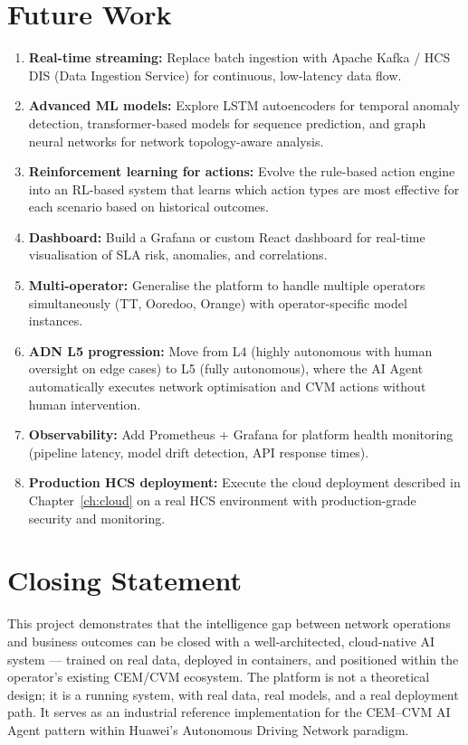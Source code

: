 \section{Future Work}

\begin{enumerate}
  \item \textbf{Real-time streaming:} Replace batch ingestion with Apache Kafka / HCS DIS (Data Ingestion Service) for continuous, low-latency data flow.
  
  \item \textbf{Advanced ML models:} Explore LSTM autoencoders for temporal anomaly detection, transformer-based models for sequence prediction, and graph neural networks for network topology-aware analysis.
  
  \item \textbf{Reinforcement learning for actions:} Evolve the rule-based action engine into an RL-based system that learns which action types are most effective for each scenario based on historical outcomes.
  
  \item \textbf{Dashboard:} Build a Grafana or custom React dashboard for real-time visualisation of SLA risk, anomalies, and correlations.
  
  \item \textbf{Multi-operator:} Generalise the platform to handle multiple operators simultaneously (TT, Ooredoo, Orange) with operator-specific model instances.
  
  \item \textbf{ADN L5 progression:} Move from L4 (highly autonomous with human oversight on edge cases) to L5 (fully autonomous), where the AI Agent automatically executes network optimisation and CVM actions without human intervention.
  
  \item \textbf{Observability:} Add Prometheus + Grafana for platform health monitoring (pipeline latency, model drift detection, API response times).
  
  \item \textbf{Production HCS deployment:} Execute the cloud deployment described in Chapter~\ref{ch:cloud} on a real HCS environment with production-grade security and monitoring.
\end{enumerate}

\section{Closing Statement}

This project demonstrates that the intelligence gap between network operations and business outcomes can be closed with a well-architected, cloud-native AI system --- trained on real data, deployed in containers, and positioned within the operator's existing CEM/CVM ecosystem. The platform is not a theoretical design; it is a running system, with real data, real models, and a real deployment path. It serves as an industrial reference implementation for the CEM--CVM AI Agent pattern within Huawei's Autonomous Driving Network paradigm.
